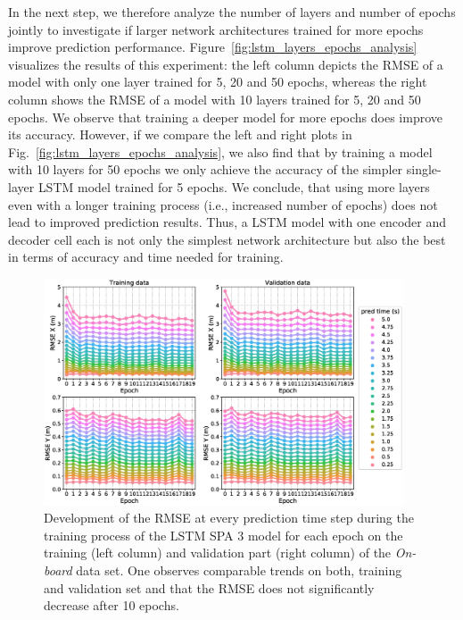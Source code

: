 In the next step, we therefore analyze the number of layers and number of epochs jointly to investigate if larger network architectures trained for more epochs improve prediction performance.
Figure~\ref{fig:lstm_layers_epochs_analysis} visualizes the results of this experiment: the left column depicts the \ac{RMSE} of a model with only one layer trained for \num{5}, \num{20} and \num{50} epochs, whereas the right column shows the \ac{RMSE} of a model with \num{10} layers trained for \num{5}, \num{20} and \num{50} epochs. 
We observe that training a deeper model for more epochs does improve its accuracy.
However, if we compare the left and right plots in Fig.~\ref{fig:lstm_layers_epochs_analysis}, we also find that by training a model with \num{10} layers for \num{50} epochs we only achieve the accuracy of the simpler single-layer \ac{LSTM} model trained for \num{5} epochs.
We conclude, that using more layers even with a longer training process (i.e., increased number of epochs) does not lead to improved prediction results.
Thus, a \ac{LSTM} model with one encoder and decoder cell each is not only the simplest network architecture but also the best in terms of accuracy and time needed for training.

\begin{figure}[t!]
  \centering
  \includegraphics[width=0.95\textwidth]{imgs/rmse_dev_over_epochs.eps}
  \caption{Development of the \ac{RMSE} at every prediction time step during the training process of the \ac{LSTM} \acs{SPA} \num{3} model for each epoch on the training (left column) and validation part (right column) of the \emph{On-board} data set.
  One observes comparable trends on both, training and validation set and that the \ac{RMSE} does not significantly decrease after \num{10} epochs.}\label{fig:rmse_dev_over_epochs}
\end{figure}

